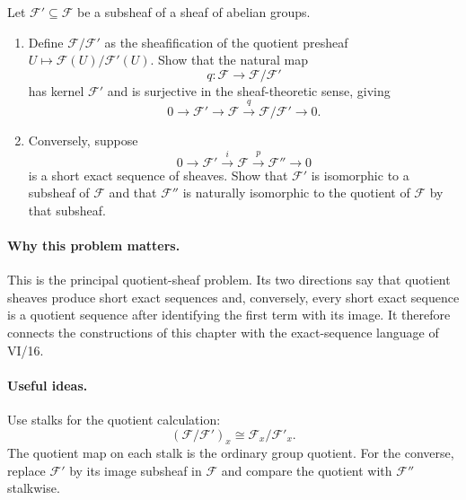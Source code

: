 \begin{problem}\label{prob:vi15-p2}
Let $\mathcal F'\subseteq\mathcal F$ be a subsheaf of a sheaf of abelian groups.
\begin{enumerate}
\item Define $\mathcal F/\mathcal F'$ as the sheafification of the quotient presheaf
$U\mapsto\mathcal F(U)/\mathcal F'(U)$.  Show that the natural map
\[
q:\mathcal F\longrightarrow\mathcal F/\mathcal F'
\]
has kernel $\mathcal F'$ and is surjective in the sheaf-theoretic sense, giving
\[
0\longrightarrow\mathcal F'\longrightarrow\mathcal F\xrightarrow{q}
\mathcal F/\mathcal F'\longrightarrow0.
\]
\item Conversely, suppose
\[
0\longrightarrow\mathcal F'\xrightarrow{i}\mathcal F\xrightarrow{p}
\mathcal F''\longrightarrow0
\]
is a short exact sequence of sheaves.  Show that $\mathcal F'$ is isomorphic to a subsheaf
of $\mathcal F$ and that $\mathcal F''$ is naturally isomorphic to the quotient of
$\mathcal F$ by that subsheaf.
\end{enumerate}
\end{problem}

\ifdefined\FullProblemDossiers
\paragraph{Why this problem matters.}
This is the principal quotient-sheaf problem.  Its two directions say that quotient
sheaves produce short exact sequences and, conversely, every short exact sequence is a
quotient sequence after identifying the first term with its image.  It therefore connects
the constructions of this chapter with the exact-sequence language of VI/16.

\paragraph{Useful ideas.}
Use stalks for the quotient calculation:
\[
(\mathcal F/\mathcal F')_x\cong\mathcal F_x/\mathcal F'_x.
\]
The quotient map on each stalk is the ordinary group quotient.  For the converse, replace
$\mathcal F'$ by its image subsheaf in $\mathcal F$ and compare the quotient with
$\mathcal F''$ stalkwise.


